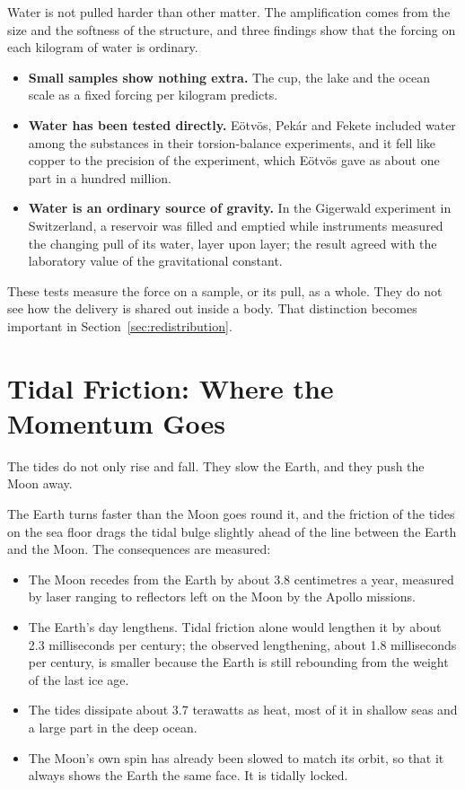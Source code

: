 \documentclass[11pt,a4paper]{article}
\begin{document}
Water is not pulled harder than other matter. The amplification comes from the size and the softness of the structure, and three findings show that the forcing on each kilogram of water is ordinary.
\begin{itemize}
    \item \textbf{Small samples show nothing extra.} The cup, the lake and the ocean scale as a fixed forcing per kilogram predicts.
    \item \textbf{Water has been tested directly.} E\"otv\"os, Pek\'ar and Fekete included water among the substances in their torsion-balance experiments, and it fell like copper to the precision of the experiment, which E\"otv\"os gave as about one part in a hundred million.
    \item \textbf{Water is an ordinary source of gravity.} In the Gigerwald experiment in Switzerland, a reservoir was filled and emptied while instruments measured the changing pull of its water, layer upon layer; the result agreed with the laboratory value of the gravitational constant.
\end{itemize}
These tests measure the force on a sample, or its pull, as a whole. They do not see how the delivery is shared out inside a body. That distinction becomes important in Section~\ref{sec:redistribution}.

\section{Tidal Friction: Where the Momentum Goes}
\label{sec:friction}

The tides do not only rise and fall. They slow the Earth, and they push the Moon away.

The Earth turns faster than the Moon goes round it, and the friction of the tides on the sea floor drags the tidal bulge slightly ahead of the line between the Earth and the Moon. The consequences are measured:
\begin{itemize}
    \item The Moon recedes from the Earth by about 3.8 centimetres a year, measured by laser ranging to reflectors left on the Moon by the Apollo missions.
    \item The Earth's day lengthens. Tidal friction alone would lengthen it by about 2.3 milliseconds per century; the observed lengthening, about 1.8 milliseconds per century, is smaller because the Earth is still rebounding from the weight of the last ice age.
    \item The tides dissipate about 3.7 terawatts as heat, most of it in shallow seas and a large part in the deep ocean.
    \item The Moon's own spin has already been slowed to match its orbit, so that it always shows the Earth the same face. It is tidally locked.
\end{itemize}
\end{document}
